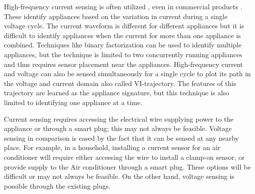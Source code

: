 High-frequency current sensing is often utilized \cite{patelFlickSwitchDetecting2007}, even in commercial products \cite{SmartBuildingManagement}. These identify appliances based on the variation in current during a single voltage cycle. The current waveform is different for different appliances but it is difficult to identify appliances when the current for more than one appliance is combined. Techniques like binary factorization \cite{langeBOLTEnergyDisaggregation2016} can be used to identify multiple appliances, but the technique is limited to two concurrently running appliances and thus requires sensor placement near the appliances.
High-frequency current and voltage can also be sensed simultaneously for a single cycle \cite{hassanEmpiricalInvestigationVI2014} to plot its path in the voltage and current domain also called VI-trajectory. The features of this trajectory are learned as the appliance signature, but this technique is also limited to identifying one appliance at a time.

Current sensing requires accessing the electrical wire supplying power to the appliance or through a smart plug; this may not always be feasible. Voltage sensing in comparison is eased by the fact that it can be sensed at any nearby place. For example, in a household, installing a current sensor for an air conditioner will require either accessing the wire to install a clamp-on sensor, or provide supply to the Air conditioner through a smart plug. These options will be difficult or may not always be feasible. On the other hand, voltage sensing is possible through the existing plugs.
